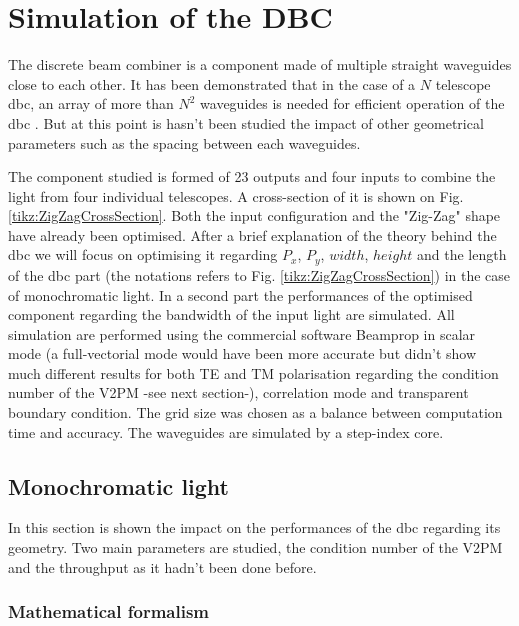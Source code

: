 \documentclass[a4paper,twoside,11pt]{article}
\begin{document}
\section{Simulation of the DBC}
    
    The discrete beam combiner is a component made of multiple straight waveguides close to each other. It has been demonstrated that in the case of a $N$ telescope \gls{dbc}, an array of more than $N^2$ waveguides is needed for efficient operation of the \gls{dbc} \cite{minardi1}. But at this point is hasn't been studied the impact of other geometrical parameters such as the spacing between each waveguides. 
    
    The component studied is formed of 23 outputs and four inputs to combine the light from four individual telescopes. A cross-section of it is shown on Fig. \ref{tikz:ZigZagCrossSection}. Both the input configuration and the "Zig-Zag" shape have already been optimised. After a brief explanation of the theory behind the \gls{dbc} we will focus on optimising it regarding $P_x$, $P_y$, $width$, $height$ and the length of the \gls{dbc} part (the notations refers to Fig. \ref{tikz:ZigZagCrossSection}) in the case of monochromatic light. In a second part the performances of the optimised component regarding the bandwidth of the input light are simulated. All simulation are performed using the commercial software Beamprop\textcompwordmark{} in scalar mode (a full-vectorial mode would have been more accurate but didn't show much different results for both TE and TM polarisation regarding the condition number of the \gls{V2PM} -see next section-), correlation mode and transparent boundary condition. The grid size was chosen as a balance between computation time and accuracy. The waveguides are simulated by a step-index core.
    

    \subsection{Monochromatic light}

    In this section is shown the impact on the performances of the \gls{dbc} regarding its geometry. Two main parameters are studied, the condition number of the \gls{V2PM} and the throughput as it hadn't been done before. 
        \subsubsection{Mathematical formalism}\label{sec:mathmono}
        
        
\end{document}
